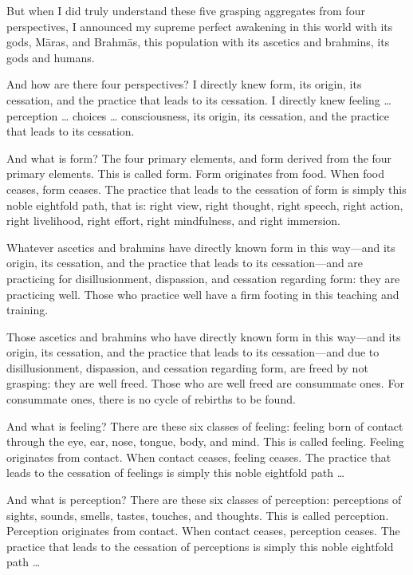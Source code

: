 \documentclass[12pt,openany]{book}%
\begin{document}
But when I did truly understand these five grasping aggregates from four perspectives, I announced my supreme perfect awakening in this world with its gods, \textsanskrit{Māras}, and \textsanskrit{Brahmās}, this population with its ascetics and brahmins, its gods and humans. 

And how are there four perspectives? I directly knew form, its origin, its cessation, and the practice that leads to its cessation. I directly knew feeling … perception … choices … consciousness, its origin, its cessation, and the practice that leads to its cessation. 

And what is form? The four primary elements, and form derived from the four primary elements. This is called form. Form originates from food. When food ceases, form ceases. The practice that leads to the cessation of form is simply this noble eightfold path, that is: right view, right thought, right speech, right action, right livelihood, right effort, right mindfulness, and right immersion. 

Whatever ascetics and brahmins have directly known form in this way—and its origin, its cessation, and the practice that leads to its cessation—and are practicing for disillusionment, dispassion, and cessation regarding form: they are practicing well. Those who practice well have a firm footing in this teaching and training. 

Those ascetics and brahmins who have directly known form in this way—and its origin, its cessation, and the practice that leads to its cessation—and due to disillusionment, dispassion, and cessation regarding form, are freed by not grasping: they are well freed. Those who are well freed are consummate ones. For consummate ones, there is no cycle of rebirths to be found. 

And what is feeling? There are these six classes of feeling: feeling born of contact through the eye, ear, nose, tongue, body, and mind. This is called feeling. Feeling originates from contact. When contact ceases, feeling ceases. The practice that leads to the cessation of feelings is simply this noble eightfold path … 

And what is perception? There are these six classes of perception: perceptions of sights, sounds, smells, tastes, touches, and thoughts. This is called perception. Perception originates from contact. When contact ceases, perception ceases. The practice that leads to the cessation of perceptions is simply this noble eightfold path … 
\end{document}
